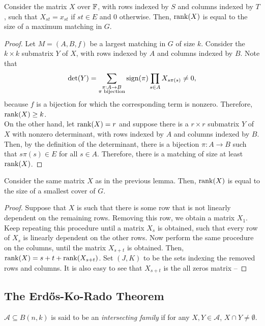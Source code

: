 \begin{flem}
	Consider the matrix $X$ over $\mathbb{F}$, with rows indexed by $S$ and columns indexed by $T$, such that $X_{st} = x_{st}$ if $st \in E$ and $0$ otherwise. Then, $\operatorname{rank}(X)$ is equal to the size of a maximum matching in $G$. 
\end{flem}
\begin{proof}
	Let $M = (A,B,f)$ be a largest matching in $G$ of size $k$. Consider the $k \times k$ submatrix $Y$ of $X$, with rows indexed by $A$ and columns indexed by $B$. Note that
	\[ \det(Y) = \sum_{\substack{\pi : A \to B \\ \pi \text{ bijection}}} \operatorname{sign}(\pi) \prod_{s \in A} X_{s \pi(s)} \ne 0, \]
	because $f$ is a bijection for which the corresponding term is nonzero. Therefore, $\operatorname{rank}(X) \ge k$.\\
	On the other hand, let $\operatorname{rank}(X) = r$ and suppose there is a $r \times r$ submatrix $Y$ of $X$ with nonzero determinant, with rows indexed by $A$ and columns indexed by $B$. Then, by the definition of the determinant, there is a bijection $\pi : A \to B$ such that $s \pi(s) \in E$ for all $s \in A$. Therefore, there is a matching of size at least $\operatorname{rank}(X)$.
\end{proof}

\begin{flem}
	Consider the same matrix $X$ as in the previous lemma. Then, $\operatorname{rank}(X)$ is equal to the size of a smallest cover of $G$.
\end{flem}
\begin{proof}
	Suppose that $X$ is such that there is some row that is not linearly dependent on the remaining rows. Removing this row, we obtain a matrix $X_1$. Keep repeating this procedure until a matrix $X_s$ is obtained, such that every row of $X_s$ is linearly dependent on the other rows. Now perform the same procedure on the columns, until the matrix $X_{s+t}$ is obtained. Then, $\operatorname{rank}(X) = s+t+\operatorname{rank}(X_{s+t})$. Set $(J,K)$ to be the sets indexing the removed rows and columns. It is also easy to see that $X_{s+t}$ is the all zeros matrix -- 
\end{proof}

\subsection{The Erd\H{o}s-Ko-Rado Theorem}

\begin{fdef}
	$\mathcal{A} \subseteq B(n,k)$ is said to be an \emph{intersecting family} if for any $X,Y \in \mathcal{A}$, $X \cap Y \ne \emptyset$.
\end{fdef}

